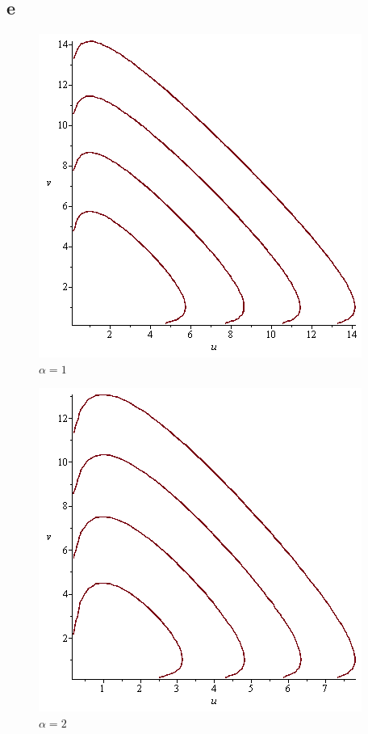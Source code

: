 \documentclass{unswmaths}
\begin{document}
\subsection*{e}
\begin{figure}[H]
    \includegraphics[scale=0.5]{orbits_1}
    \caption{$\alpha = 1$}
\end{figure}
\begin{figure}[H]
    \includegraphics[scale=0.5]{orbits_2}
    \caption{$\alpha = 2$}
\end{figure}
\end{document}
